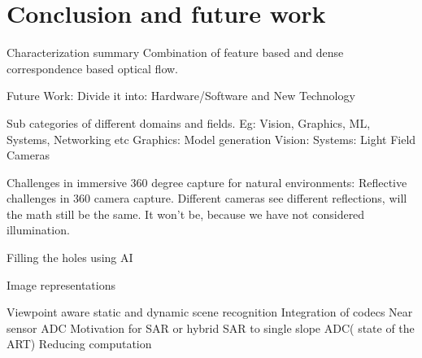 \chapter{Conclusion and future work}

Characterization summary
Combination of feature based and dense correspondence based optical flow. 

Future Work:
Divide it into:
Hardware/Software and New Technology

Sub categories of different domains and fields. 
Eg: Vision, Graphics, ML, Systems, Networking etc
Graphics: Model generation 
Vision: 
Systems: Light Field Cameras

Challenges in immersive 360 degree capture for natural environments:
Reflective challenges in 360 camera capture. Different cameras see different reflections, will the math still be the same. It won’t be, because we have not considered illumination. 

Filling the holes using AI

Image representations

Viewpoint aware static and dynamic scene recognition
Integration of codecs 
Near sensor ADC
Motivation for SAR or hybrid SAR to single slope ADC( state of the ART)
Reducing computation 
